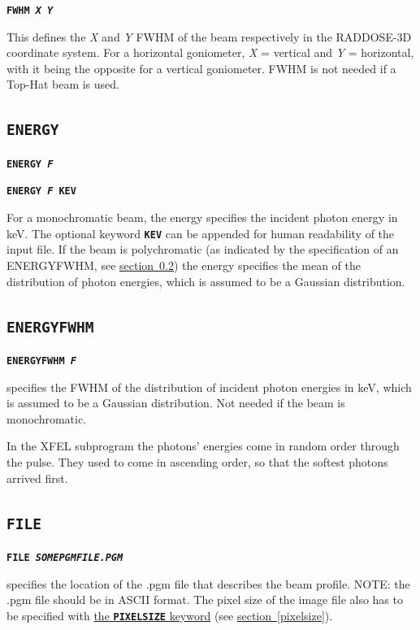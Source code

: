 \documentclass[a4paper]{article}
\newcommand{\Keyword}[1]{\texttt{\textbf{#1}}\xspace}
\newcommand{\SB}{\\[0.2em]}
\begin{document}
\label{beamfwhm}
\noindent \Keyword{FWHM \textit{X Y}}

This defines the \textit{X} and \textit{Y} FWHM of the beam respectively in the RADDOSE-3D coordinate system. 
For a horizontal goniometer, \textit{X} = vertical and \textit{Y} = horizontal, with it being the opposite for a vertical goniometer. FWHM is not needed if a Top-Hat beam is used.


\subsection{\Keyword{ENERGY}}

\noindent \Keyword{ENERGY \textit{F}}

\noindent \Keyword{ENERGY \textit{F} KEV}

For a monochromatic beam, the energy specifies the incident photon energy in keV. The optional keyword \Keyword{KEV} can be appended for human readability of the input file. \newline \indent If the beam is polychromatic (as indicated by the specification of an ENERGYFWHM, see \hyperref[energyfwhm]{section~\ref*{energyfwhm}}) the energy specifies the mean of the distribution of photon energies, which is assumed to be a Gaussian distribution. 

\subsection{\Keyword{ENERGYFWHM}}
\label{energyfwhm}

\noindent \Keyword{ENERGYFWHM \textit{F}}

specifies the FWHM of the distribution of incident photon energies in keV, which is assumed to be a Gaussian distribution. Not needed if the beam is monochromatic.

In the XFEL subprogram the photons' energies come in random order through the pulse. They used to come in ascending order, so that the softest photons arrived first.

\subsection{\Keyword{FILE}}
\label{file}

\noindent \Keyword{FILE \textit{SOMEPGMFILE.PGM}}

specifies the location of the .pgm file that describes the beam profile. NOTE: the .pgm file should be in ASCII format. The pixel size of the image file also has to be specified with \hyperref[pixelsize]{the \Keyword{PIXELSIZE} keyword} (see \hyperref[pixelsize]{section~\ref*{pixelsize}}).\SB
\end{document}
